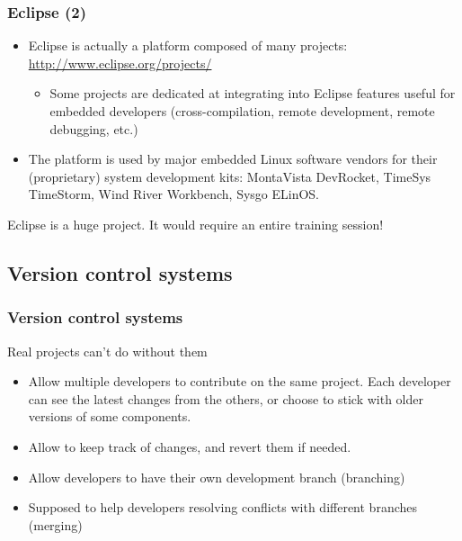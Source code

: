 \begin{frame}
  \frametitle{Eclipse (2)}
  \begin{itemize}
  \item Eclipse is actually a platform composed of many projects:\\
    \url{http://www.eclipse.org/projects/}
    \begin{itemize}
    \item Some projects are dedicated at integrating into Eclipse
      features useful for embedded developers (cross-compilation,
      remote development, remote debugging, etc.)
    \end{itemize}
  \item The platform is used by major embedded Linux software vendors
    for their (proprietary) system development kits: MontaVista
    DevRocket, TimeSys TimeStorm, Wind River Workbench, Sysgo ELinOS.
  \end{itemize}
  Eclipse is a huge project.  It would require an entire training
  session!
\end{frame}

\subsection{Version control systems}

\begin{frame}
  \frametitle{Version control systems}
  Real projects can't do without them
  \begin{itemize}
  \item Allow multiple developers to contribute on the same
    project. Each developer can see the latest changes from the
    others, or choose to stick with older versions of some components.
  \item Allow to keep track of changes, and revert them if needed.
  \item Allow developers to have their own development branch
    (branching)
  \item Supposed to help developers resolving conflicts with different
    branches (merging)
  \end{itemize}
\end{frame}

